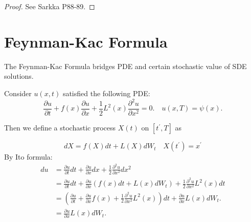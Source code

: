 \documentclass{article}
\begin{document}
\begin{proof}
    See Sarkka P88-89.
\end{proof}

\section{Feynman-Kac Formula}
The Feynman-Kac Formula bridges PDE and certain stochastic value of SDE solutions.

Consider $u(x, t)$ satisfied the following PDE:
\begin{equation}
    \frac{\partial u}{\partial t}+f(x) \frac{\partial u}{\partial x}+\frac{1}{2} L^{2}(x) \frac{\partial^{2} u}{\partial x^{2}}=0 . \quad u(x, T)=\psi(x) .
\end{equation}

Then we define a stochastic process $X(t)$  on  $\left[t^{\prime}, T\right]$  as

\begin{equation}
    d X=f(X) d t+L(X) d W_{t} \quad X\left(t^{\prime}\right)=x^{\prime}
\end{equation}
By Ito formula:
\begin{equation}
    \begin{aligned}
    d u & =\frac{\partial u}{\partial t} d t+\frac{\partial u}{\partial x} d x+\frac{1}{2} \frac{\partial^{2} u}{\partial x^{2}} d x^{2} \\
    & =\frac{\partial u}{\partial t} d t+\frac{\partial u}{\partial x}\left(f(x) d t+L(x) d W_{t}\right)+\frac{1}{2} \frac{\partial^{2} u}{\partial x^{2}} L^{2}(x) d t \\
    & =\left(\frac{\partial u}{\partial t}+\frac{\partial u}{\partial x} f(x)+\frac{1}{2} \frac{\partial^{2} u}{\partial x^{2}} L^{2}(x)\right) d t+\frac{\partial u}{\partial x} L(x) d W_{t} . \\
    & =\frac{\partial u}{\partial x} L(x) d W_{t} .
    \end{aligned}
\end{equation}
\end{document}
